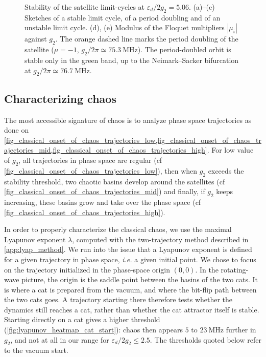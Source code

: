 \documentclass[aps,prx,reprint,floatfix,amsmath,amssymb,longbibliography]{revtex4-2}
\newcommand{\eps}{\varepsilon}
\begin{document}
\begin{figure}[tbp]
\begin{minipage}[c]{0.78\columnwidth}
\begin{subfigure}[tbp]{\columnwidth}
            \label{fig_floq_mult_above_period_doubling}
        \end{subfigure}
    \end{minipage}
    \caption{Stability of the satellite limit-cycles at $\eps_d/2g_2=5.06$. (a)--(c) Sketches of a stable limit cycle, of a period doubling and of an unstable limit cycle. (d), (e) Modulus of the Floquet multipliers $|\mu_i|$ against $g_2$. The orange dashed line marks the period doubling of the satellite ($\mu=-1$, $g_2/2\pi\simeq75.3~\mathrm{MHz}$). The period-doubled orbit is stable only in the green band, up to the Neimark--Sacker bifurcation at $g_2/2\pi\simeq76.7~\mathrm{MHz}$.}
    \label{fig_hill_method}
\end{figure}


\subsection{Characterizing chaos}
\label{subsec:chaos_lyap}

The most accessible signature of chaos is to analyze phase space trajectories as done on \cref{fig_classical_onset_of_chaos_trajectories_low,fig_classical_onset_of_chaos_trajectories_mid,fig_classical_onset_of_chaos_trajectories_high}. For low value of $g_2$, all trajectories in phase space are regular (cf \cref{fig_classical_onset_of_chaos_trajectories_low}), then when $g_2$ exceeds the stability threshold, two chaotic basins develop around the satellites (cf \cref{fig_classical_onset_of_chaos_trajectories_mid}) and finally, if $g_2$ keeps increasing, these basins grow and take over the phase space (cf \cref{fig_classical_onset_of_chaos_trajectories_high}).

In order to properly characterize the classical chaos, we use the maximal Lyapunov exponent $\lambda$, computed with the two-trajectory method described in \cref{app:lyap_method}. We run into the issue that a Lyapunov exponent is defined for a given trajectory in phase space, \textit{i.e.} a given initial point. We chose to focus on the trajectory initialized in the phase-space origin $(0,0)$. In the rotating-wave picture, the origin is the saddle point between the basins of the two cats. It is where a cat is prepared from the vacuum, and where the bit-flip path between the two cats goes. A trajectory starting there therefore tests whether the dynamics still reaches a cat, rather than whether the cat attractor itself is stable. Starting directly on a cat gives a higher threshold (\cref{fig:lyapunov_heatmap_cat_start}): chaos then appears $5$ to $23~\mathrm{MHz}$ further in $g_2$, and not at all in our range for $\eps_d/2g_2\le2.5$. The thresholds quoted below refer to the vacuum start.
\end{document}
